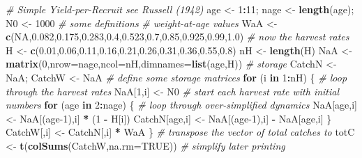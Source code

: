 \documentclass[
  lang=cn,
  11pt,
  scheme=chinese,
  chinesefont=nofont,
  citestyle=gb7714-2015,
  bibstyle=gb7714-2015]{elegantbook}
\newenvironment{Shaded}{\begin{snugshade}}{\end{snugshade}}
\newcommand{\AttributeTok}[1]{\textcolor[rgb]{0.13,0.29,0.53}{#1}}
\newcommand{\CommentTok}[1]{\textcolor[rgb]{0.56,0.35,0.01}{\textit{#1}}}
\newcommand{\ConstantTok}[1]{\textcolor[rgb]{0.56,0.35,0.01}{#1}}
\newcommand{\ControlFlowTok}[1]{\textcolor[rgb]{0.13,0.29,0.53}{\textbf{#1}}}
\newcommand{\DecValTok}[1]{\textcolor[rgb]{0.00,0.00,0.81}{#1}}
\newcommand{\FloatTok}[1]{\textcolor[rgb]{0.00,0.00,0.81}{#1}}
\newcommand{\FunctionTok}[1]{\textcolor[rgb]{0.13,0.29,0.53}{\textbf{#1}}}
\newcommand{\NormalTok}[1]{#1}
\newcommand{\OtherTok}[1]{\textcolor[rgb]{0.56,0.35,0.01}{#1}}
\newcommand{\SpecialCharTok}[1]{\textcolor[rgb]{0.81,0.36,0.00}{\textbf{#1}}}
\begin{document}
\begin{Shaded}
\begin{Highlighting}[]
\CommentTok{\# Simple Yield{-}per{-}Recruit see Russell (1942)  }
\NormalTok{age }\OtherTok{\textless{}{-}} \DecValTok{1}\SpecialCharTok{:}\DecValTok{11}\NormalTok{;  nage }\OtherTok{\textless{}{-}} \FunctionTok{length}\NormalTok{(age); N0 }\OtherTok{\textless{}{-}} \DecValTok{1000}  \CommentTok{\# some definitions  }
 \CommentTok{\# weight{-}at{-}age values  }
\NormalTok{WaA }\OtherTok{\textless{}{-}} \FunctionTok{c}\NormalTok{(}\ConstantTok{NA}\NormalTok{,}\FloatTok{0.082}\NormalTok{,}\FloatTok{0.175}\NormalTok{,}\FloatTok{0.283}\NormalTok{,}\FloatTok{0.4}\NormalTok{,}\FloatTok{0.523}\NormalTok{,}\FloatTok{0.7}\NormalTok{,}\FloatTok{0.85}\NormalTok{,}\FloatTok{0.925}\NormalTok{,}\FloatTok{0.99}\NormalTok{,}\FloatTok{1.0}\NormalTok{)  }
 \CommentTok{\# now the harvest rates  }
\NormalTok{H }\OtherTok{\textless{}{-}} \FunctionTok{c}\NormalTok{(}\FloatTok{0.01}\NormalTok{,}\FloatTok{0.06}\NormalTok{,}\FloatTok{0.11}\NormalTok{,}\FloatTok{0.16}\NormalTok{,}\FloatTok{0.21}\NormalTok{,}\FloatTok{0.26}\NormalTok{,}\FloatTok{0.31}\NormalTok{,}\FloatTok{0.36}\NormalTok{,}\FloatTok{0.55}\NormalTok{,}\FloatTok{0.8}\NormalTok{)  }
\NormalTok{nH }\OtherTok{\textless{}{-}} \FunctionTok{length}\NormalTok{(H)  }
\NormalTok{NaA }\OtherTok{\textless{}{-}} \FunctionTok{matrix}\NormalTok{(}\DecValTok{0}\NormalTok{,}\AttributeTok{nrow=}\NormalTok{nage,}\AttributeTok{ncol=}\NormalTok{nH,}\AttributeTok{dimnames=}\FunctionTok{list}\NormalTok{(age,H)) }\CommentTok{\# storage  }
\NormalTok{CatchN }\OtherTok{\textless{}{-}}\NormalTok{ NaA;  CatchW }\OtherTok{\textless{}{-}}\NormalTok{ NaA      }\CommentTok{\# define some storage matrices  }
\ControlFlowTok{for}\NormalTok{ (i }\ControlFlowTok{in} \DecValTok{1}\SpecialCharTok{:}\NormalTok{nH) \{                }\CommentTok{\# loop through the harvest rates  }
\NormalTok{   NaA[}\DecValTok{1}\NormalTok{,i] }\OtherTok{\textless{}{-}}\NormalTok{ N0  }\CommentTok{\# start each harvest rate with initial numbers  }
   \ControlFlowTok{for}\NormalTok{ (age }\ControlFlowTok{in} \DecValTok{2}\SpecialCharTok{:}\NormalTok{nage) \{  }\CommentTok{\# loop through over{-}simplified dynamics  }
\NormalTok{      NaA[age,i] }\OtherTok{\textless{}{-}}\NormalTok{ NaA[(age}\DecValTok{{-}1}\NormalTok{),i] }\SpecialCharTok{*}\NormalTok{ (}\DecValTok{1} \SpecialCharTok{{-}}\NormalTok{ H[i])  }
\NormalTok{      CatchN[age,i] }\OtherTok{\textless{}{-}}\NormalTok{ NaA[(age}\DecValTok{{-}1}\NormalTok{),i] }\SpecialCharTok{{-}}\NormalTok{ NaA[age,i]  }
\NormalTok{   \}  }
\NormalTok{   CatchW[,i] }\OtherTok{\textless{}{-}}\NormalTok{ CatchN[,i] }\SpecialCharTok{*}\NormalTok{ WaA  }
\NormalTok{\}                      }\CommentTok{\# transpose the vector of total catches to  }
\NormalTok{totC }\OtherTok{\textless{}{-}} \FunctionTok{t}\NormalTok{(}\FunctionTok{colSums}\NormalTok{(CatchW,}\AttributeTok{na.rm=}\ConstantTok{TRUE}\NormalTok{))   }\CommentTok{\# simplify later printing  }
\end{Highlighting}
\end{Shaded}
\end{document}
